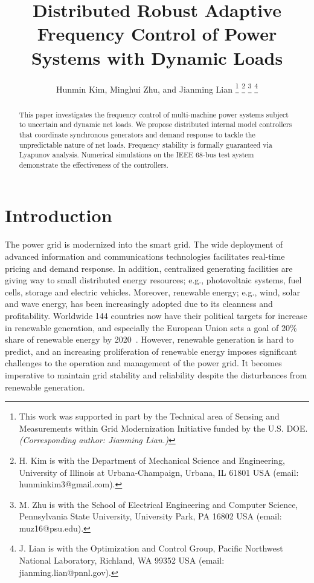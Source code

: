 \documentclass[journal]{IEEEtran}
\date{}
\begin{document}
\title{Distributed Robust Adaptive Frequency Control of Power Systems with Dynamic Loads}
\author{
Hunmin Kim, Minghui Zhu, and Jianming Lian
\thanks{This work was supported in part by the Technical area of Sensing and Measurements within Grid Modernization Initiative funded by the U.S. DOE. \textit{(Corresponding author: Jianming Lian.)}}
\thanks{H. Kim is with
the Department of Mechanical Science and Engineering, University of Illinois at Urbana-Champaign, Urbana, IL 61801 USA (email: hunminkim3@gmail.com).}
\thanks{M. Zhu is with the School of Electrical Engineering and Computer Science, Pennsylvania State University, University Park, PA 16802 USA (email: muz16@psu.edu).}
\thanks{
J. Lian is with the Optimization and Control Group, Pacific Northwest National Laboratory, Richland, WA 99352 USA (email: jianming.lian@pnnl.gov).}
}

\maketitle

\begin{abstract}
This paper investigates the frequency control of multi-machine power systems subject to uncertain and dynamic net loads. We propose distributed internal model controllers that coordinate synchronous generators and demand response to tackle the unpredictable nature of net loads. Frequency stability is formally guaranteed via Lyapunov analysis. Numerical simulations on the IEEE 68-bus test system demonstrate the effectiveness of the controllers.
\end{abstract}

\section{Introduction}
The power grid is modernized into the smart grid. The wide deployment of advanced information and communications technologies facilitates real-time pricing and demand response. In addition, centralized generating facilities are giving way to small distributed energy resources; e.g., photovoltaic systems, fuel cells, storage and electric vehicles. Moreover, renewable energy; e.g., wind, solar and wave energy, has been increasingly adopted due to its cleanness and profitability. 
Worldwide 144 countries now have their political targets for increase in renewable generation, and especially the European Union sets a goal of 20\% share of renewable energy by 2020~\cite{ren212014global}.
However, renewable generation is hard to predict, and an increasing proliferation of renewable energy imposes significant challenges to the operation and management of the power grid. It becomes imperative to maintain grid stability and reliability despite the disturbances from renewable generation.
\end{document}
